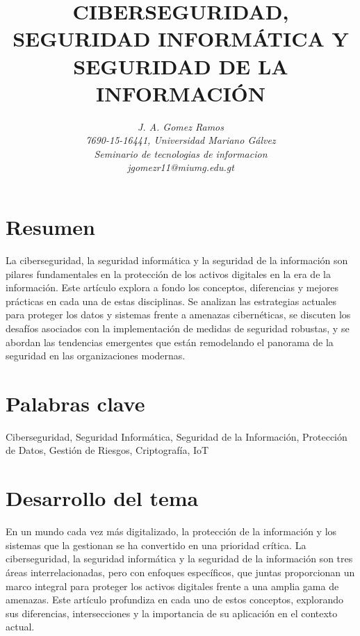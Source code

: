 \documentclass[12pt]{article}
\begin{document}
\title{\textbf{CIBERSEGURIDAD, SEGURIDAD INFORMÁTICA Y SEGURIDAD DE LA INFORMACIÓN}}
\author{\textit{J. A. Gomez Ramos}\\
\textit{7690-15-16441, Universidad Mariano Gálvez}\\
\textit{Seminario de tecnologias de informacion}\\
\textit{jgomezr11@miumg.edu.gt}}
\date{}
\maketitle

\section*{Resumen}
La ciberseguridad, la seguridad informática y la seguridad de la información son pilares fundamentales en la protección de los activos digitales en la era de la información. Este artículo explora a fondo los conceptos, diferencias y mejores prácticas en cada una de estas disciplinas. Se analizan las estrategias actuales para proteger los datos y sistemas frente a amenazas cibernéticas, se discuten los desafíos asociados con la implementación de medidas de seguridad robustas, y se abordan las tendencias emergentes que están remodelando el panorama de la seguridad en las organizaciones modernas.

\section*{Palabras clave}
Ciberseguridad, Seguridad Informática, Seguridad de la Información, Protección de Datos, Gestión de Riesgos, Criptografía, IoT

\section*{Desarrollo del tema}

En un mundo cada vez más digitalizado, la protección de la información y los sistemas que la gestionan se ha convertido en una prioridad crítica. La ciberseguridad, la seguridad informática y la seguridad de la información son tres áreas interrelacionadas, pero con enfoques específicos, que juntas proporcionan un marco integral para proteger los activos digitales frente a una amplia gama de amenazas. Este artículo profundiza en cada uno de estos conceptos, explorando sus diferencias, intersecciones y la importancia de su aplicación en el contexto actual.
\end{document}
